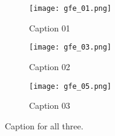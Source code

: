 \begin{figure}[H]
	\centering
	\begin{subfigure}[b]{0.3\textwidth}
	\texttt{[image: gfe\_01.png]}
	\caption{Caption 01}
	\label{fig:gfe_01}
	\end{subfigure}
	\hfill
	\begin{subfigure}[b]{0.3\textwidth}
	\texttt{[image: gfe\_03.png]}
	\caption{Caption 02}
	\label{fig:gfe_03}
	\end{subfigure}
	\hfill
	\begin{subfigure}[b]{0.3\textwidth}
	\texttt{[image: gfe\_05.png]}
	\caption{Caption 03}
	\label{fig:cap01}
	\end{subfigure}
	\caption{Caption for all three.}
	\label{fig:gfe_05}
\end{figure}









